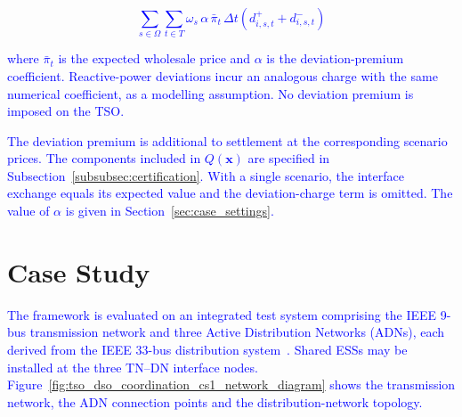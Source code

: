 \documentclass[preprint,12pt]{elsarticle}
\begin{document}
\textcolor{blue}{
    \begin{equation}
        \sum_{s\in\Omega}\sum_{t\in T}
        \omega_s\,\alpha\,\bar{\pi}_t\,\Delta t
        \left(d^{+}_{i,s,t}+d^{-}_{i,s,t}\right)
        \label{eq:commitment_charge}
    \end{equation}
}

\noindent
\textcolor{blue}{
    where $\bar{\pi}_t$ is the expected wholesale price and $\alpha$ is the deviation-premium coefficient.
    Reactive-power deviations incur an analogous charge with the same numerical coefficient, as a modelling assumption. No deviation premium is imposed on the TSO.
}

\textcolor{blue}{
    The deviation premium is additional to settlement at the corresponding scenario prices. The components included in $Q(\boldsymbol{x})$ are specified in Subsection~\ref{subsubsec:certification}.
    With a single scenario, the interface exchange equals its expected value and the deviation-charge term is omitted. 
    The value of $\alpha$ is given in Section~\ref{sec:case_settings}.
}

\section{Case Study}
\label{sec:case_studies}

\textcolor{blue}{
    The framework is evaluated on an integrated test system comprising the IEEE 9-bus transmission network and three Active Distribution Networks (ADNs), each derived from the IEEE 33-bus distribution system~\cite{zimmerman_2011,ieee_case33}.
    Shared ESSs may be installed at the three TN--DN interface nodes. 
    Figure~\ref{fig:tso_dso_coordination_cs1_network_diagram} shows the transmission network, the ADN connection points and the distribution-network topology.
}

\end{document}

